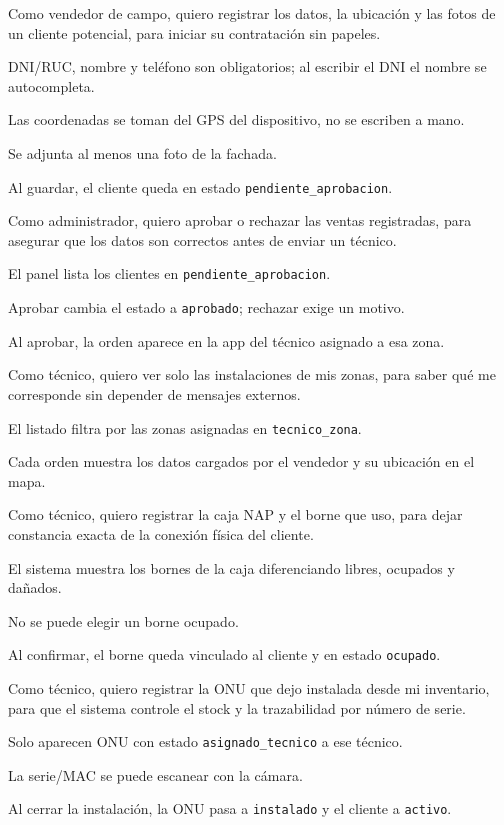 {Como vendedor de campo, quiero registrar los datos, la ubicación y las fotos de un
cliente potencial, para iniciar su contratación sin papeles.}
{\item DNI/RUC, nombre y teléfono son obligatorios; al escribir el DNI el nombre se autocompleta.
 \item Las coordenadas se toman del GPS del dispositivo, no se escriben a mano.
 \item Se adjunta al menos una foto de la fachada.
 \item Al guardar, el cliente queda en estado \texttt{pendiente\_aprobacion}.}

{Como administrador, quiero aprobar o rechazar las ventas registradas, para asegurar
que los datos son correctos antes de enviar un técnico.}
{\item El panel lista los clientes en \texttt{pendiente\_aprobacion}.
 \item Aprobar cambia el estado a \texttt{aprobado}; rechazar exige un motivo.
 \item Al aprobar, la orden aparece en la app del técnico asignado a esa zona.}

{Como técnico, quiero ver solo las instalaciones de mis zonas, para saber qué me
corresponde sin depender de mensajes externos.}
{\item El listado filtra por las zonas asignadas en \texttt{tecnico\_zona}.
 \item Cada orden muestra los datos cargados por el vendedor y su ubicación en el mapa.}

{Como técnico, quiero registrar la caja NAP y el borne que uso, para dejar constancia
exacta de la conexión física del cliente.}
{\item El sistema muestra los bornes de la caja diferenciando libres, ocupados y dañados.
 \item No se puede elegir un borne ocupado.
 \item Al confirmar, el borne queda vinculado al cliente y en estado \texttt{ocupado}.}

{Como técnico, quiero registrar la ONU que dejo instalada desde mi inventario, para que
el sistema controle el stock y la trazabilidad por número de serie.}
{\item Solo aparecen ONU con estado \texttt{asignado\_tecnico} a ese técnico.
 \item La serie/MAC se puede escanear con la cámara.
 \item Al cerrar la instalación, la ONU pasa a \texttt{instalado} y el cliente a \texttt{activo}.}

